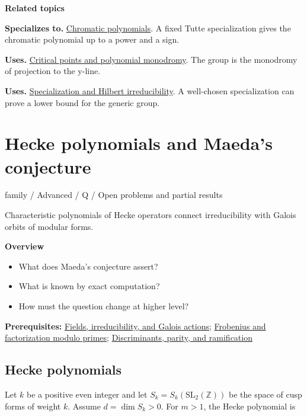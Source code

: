 \documentclass[11pt,a4paper,oneside,openany]{book}
\begin{document}
\par\medskip\begingroup\footnotesize\setlength{\parskip}{1pt}\textbf{\sffamily\color{atlasgreen}Related topics}\par
\color{black}\textbf{Specializes to.} \hyperlink{article:chromatic-polynomials}{Chromatic polynomials}. A fixed Tutte specialization gives the chromatic polynomial up to a power and a sign.\par
\color{black}\textbf{Uses.} \hyperlink{article:critical-points-monodromy}{Critical points and polynomial monodromy}. The group is the monodromy of projection to the y-line.\par
\color{black}\textbf{Uses.} \hyperlink{article:specialization}{Specialization and Hilbert irreducibility}. A well-chosen specialization can prove a lower bound for the generic group.\par
\endgroup
\chapter{Hecke polynomials and Maeda's conjecture}\label{article:hecke-polynomials}\hypertarget{article:hecke-polynomials}{}\color{black}
{\sffamily\small\color{atlasgold}family / Advanced / Q / Open problems and partial results}\par\medskip
Characteristic polynomials of Hecke operators connect irreducibility with Galois orbits of modular forms.\par\medskip
\textbf{Overview}\begin{itemize}
\item What does Maeda's conjecture assert?
\item What is known by exact computation?
\item How must the question change at higher level?
\end{itemize}
{\small\textbf{Prerequisites:} \hyperlink{article:foundations}{Fields, irreducibility, and Galois actions}; \hyperlink{article:frobenius}{Frobenius and factorization modulo primes}; \hyperlink{article:discriminants}{Discriminants, parity, and ramification}}\par
{}\section{Hecke polynomials}
\color{black} Let \(k\) be a positive even integer and let \(S_k=S_k(\mathrm{SL}_2(\mathbb Z))\) be the space of cusp forms of weight \(k\). Assume \(d=\dim S_k>0\). For \(m>1\), the Hecke polynomial is\par
\end{document}
